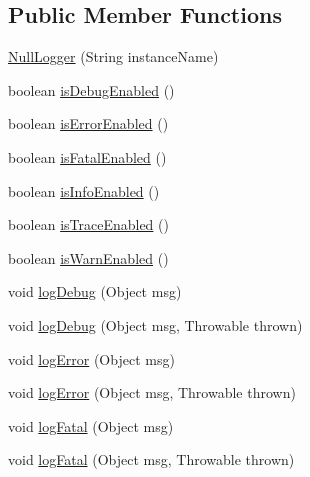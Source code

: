 \subsection*{Public Member Functions}
\begin{DoxyCompactItemize}
\item 
\mbox{\hyperlink{classcom_1_1mysql_1_1jdbc_1_1log_1_1_null_logger_a16de8639c3f8b5c7109af5d00660b5c3}{Null\+Logger}} (String instance\+Name)
\item 
boolean \mbox{\hyperlink{classcom_1_1mysql_1_1jdbc_1_1log_1_1_null_logger_a4d03ecff15bd998bbffd11a684e561b5}{is\+Debug\+Enabled}} ()
\item 
boolean \mbox{\hyperlink{classcom_1_1mysql_1_1jdbc_1_1log_1_1_null_logger_a8d58edceeb939928c01ae93a4c62dfd5}{is\+Error\+Enabled}} ()
\item 
boolean \mbox{\hyperlink{classcom_1_1mysql_1_1jdbc_1_1log_1_1_null_logger_a7393a431840b4e7cb9ac18f0e2a88744}{is\+Fatal\+Enabled}} ()
\item 
boolean \mbox{\hyperlink{classcom_1_1mysql_1_1jdbc_1_1log_1_1_null_logger_a0fd40d0617f53beec5f85253996a1e5f}{is\+Info\+Enabled}} ()
\item 
boolean \mbox{\hyperlink{classcom_1_1mysql_1_1jdbc_1_1log_1_1_null_logger_af97ff4755fae09351593f88f65298b30}{is\+Trace\+Enabled}} ()
\item 
boolean \mbox{\hyperlink{classcom_1_1mysql_1_1jdbc_1_1log_1_1_null_logger_aad72483ac79c28b596fdf1a3d4642b9e}{is\+Warn\+Enabled}} ()
\item 
void \mbox{\hyperlink{classcom_1_1mysql_1_1jdbc_1_1log_1_1_null_logger_a947d1f20badd221aa5aaf15a5944dd56}{log\+Debug}} (Object msg)
\item 
void \mbox{\hyperlink{classcom_1_1mysql_1_1jdbc_1_1log_1_1_null_logger_a2a1e6ac627cdeeb88e0acd8512d42839}{log\+Debug}} (Object msg, Throwable thrown)
\item 
void \mbox{\hyperlink{classcom_1_1mysql_1_1jdbc_1_1log_1_1_null_logger_a971d9823090761b63e867cf7950d0840}{log\+Error}} (Object msg)
\item 
void \mbox{\hyperlink{classcom_1_1mysql_1_1jdbc_1_1log_1_1_null_logger_a2488e3fd92fcca69b2bc07f10b369270}{log\+Error}} (Object msg, Throwable thrown)
\item 
void \mbox{\hyperlink{classcom_1_1mysql_1_1jdbc_1_1log_1_1_null_logger_affbd0fc8b13b06f765195be1de3b4535}{log\+Fatal}} (Object msg)
\item 
void \mbox{\hyperlink{classcom_1_1mysql_1_1jdbc_1_1log_1_1_null_logger_aefb06f46d91ee385eb925ef2659f591c}{log\+Fatal}} (Object msg, Throwable thrown)

\end{DoxyCompactItemize}
